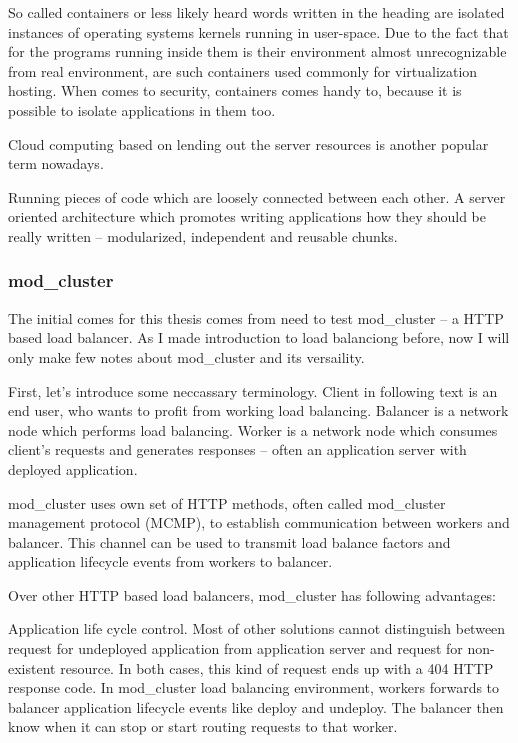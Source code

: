 \documentclass[
  master,
  biblatex,
  glossaries,
  index
]{kidiplom}
\begin{document}
So called containers or less likely heard words written in the heading are isolated instances of operating systems kernels running in user-space. Due to the fact that for the programs running inside them is their environment almost unrecognizable from real environment, are such containers used commonly for virtualization hosting. When comes to security, containers comes handy to, because it is possible to isolate applications in them too. %


Cloud computing based on lending out the server resources is another popular term nowadays.


Running pieces of code which are loosely connected between each other. A server oriented architecture which promotes writing applications how they should be really written -- modularized, independent and reusable chunks. %

\subsubsection{mod\_cluster}


The initial comes for this thesis comes from need to test mod\_cluster -- a HTTP based load balancer. As I made introduction to load balanciong before, now I will only make few notes about mod\_cluster and its versaility.

First, let's introduce some neccassary terminology. Client in following text is an end user, who wants to profit from working load balancing. Balancer is a network node which performs load balancing. Worker is a network node which consumes client's requests and generates responses -- often an application server with deployed application. %

mod\_cluster uses own set of HTTP methods, often called mod\_cluster management protocol (MCMP)\cite{bib:modcluster}, to establish communication between workers and balancer. This channel can be used to transmit load balance factors and application lifecycle events from workers to balancer.

Over other HTTP based load balancers, mod\_cluster has following advantages:

Application life cycle control. Most of other solutions cannot distinguish between request for undeployed application from application server and request for non-existent resource. In both cases, this kind of request ends up with a 404 HTTP response code. In mod\_cluster load balancing environment, workers forwards to balancer application lifecycle events like deploy and undeploy. The balancer then know when it can stop or start routing requests to that worker.\cite{bib:modcluster}
\end{document}
